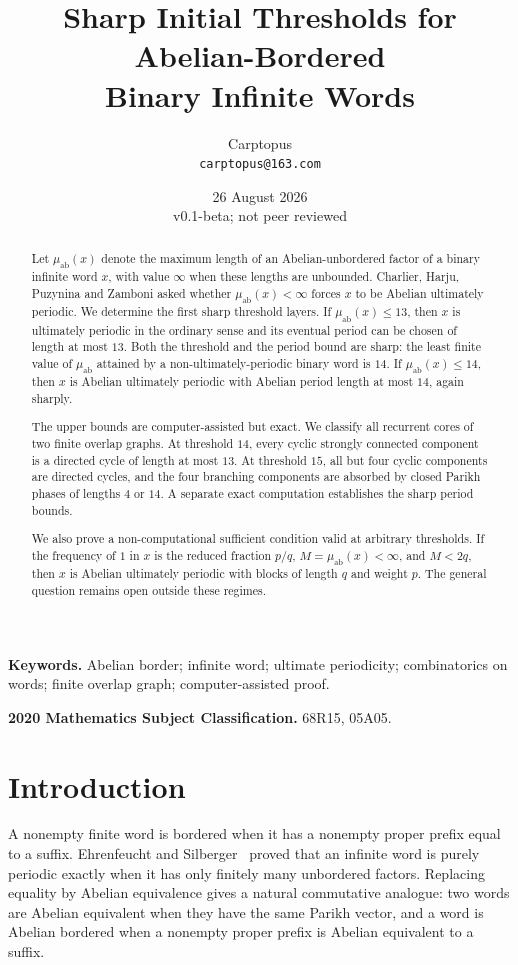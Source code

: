 \documentclass[11pt]{article}
\title{Sharp Initial Thresholds for Abelian-Bordered\\
Binary Infinite Words}
\author{Carptopus\\\small\texttt{carptopus@163.com}}
\date{26 August 2026\\\small v0.1-beta; not peer reviewed}
\begin{document}
\maketitle

\begin{abstract}
Let $\mu_{\mathrm{ab}}(x)$ denote the maximum length of an
Abelian-unbordered factor of a binary infinite word $x$, with value $\infty$
when these lengths are unbounded. Charlier, Harju, Puzynina and Zamboni asked
whether $\mu_{\mathrm{ab}}(x)<\infty$ forces $x$ to be Abelian ultimately
periodic. We determine the first sharp threshold layers. If
$\mu_{\mathrm{ab}}(x)\le13$, then $x$ is ultimately periodic in the ordinary
sense and its eventual period can be chosen of length at most $13$. Both the
threshold and the period bound are sharp: the least finite value of
$\mu_{\mathrm{ab}}$ attained by a non-ultimately-periodic binary word is $14$.
If $\mu_{\mathrm{ab}}(x)\le14$, then $x$ is Abelian ultimately periodic with
Abelian period length at most $14$, again sharply.

The upper bounds are computer-assisted but exact. We classify all recurrent
cores of two finite overlap graphs. At threshold $14$, every cyclic strongly
connected component is a directed cycle of length at most $13$. At threshold
$15$, all but four cyclic components are directed cycles, and the four
branching components are absorbed by closed Parikh phases of lengths $4$ or
$14$. A separate exact computation establishes the sharp period bounds.

We also prove a non-computational sufficient condition valid at arbitrary
thresholds. If the frequency of $1$ in $x$ is the reduced fraction $p/q$,
$M=\mu_{\mathrm{ab}}(x)<\infty$, and $M<2q$, then $x$ is Abelian ultimately
periodic with blocks of length $q$ and weight $p$. The general question
remains open outside these regimes.
\end{abstract}

\noindent\textbf{Keywords.} Abelian border; infinite word; ultimate
periodicity; combinatorics on words; finite overlap graph; computer-assisted
proof.

\medskip
\noindent\textbf{2020 Mathematics Subject Classification.} 68R15, 05A05.

\section{Introduction}

A nonempty finite word is bordered when it has a nonempty proper prefix equal
to a suffix. Ehrenfeucht and Silberger~\cite{ES} proved that an infinite word
is purely periodic exactly when it has only finitely many unbordered factors.
Replacing equality by Abelian equivalence gives a natural commutative
analogue: two words are Abelian equivalent when they have the same Parikh
vector, and a word is Abelian bordered when a nonempty proper prefix is
Abelian equivalent to a suffix.
\end{document}
